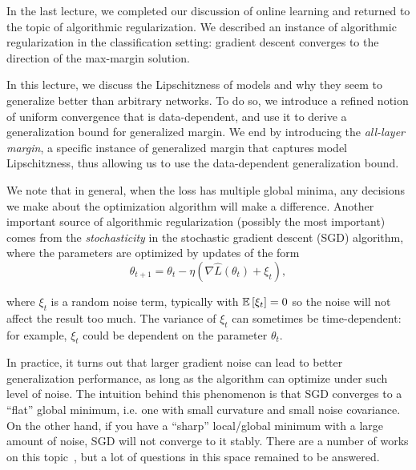 \setcounter{section}{0}




In the last lecture, we completed our discussion of online learning and returned to the topic of algorithmic regularization. We described an instance of algorithmic regularization in the classification setting: gradient descent converges to the direction of the max-margin solution.

In this lecture, we discuss the Lipschitzness of models and why they seem to generalize better than arbitrary networks. To do so, we introduce a refined notion of uniform convergence that is data-dependent, and use it to derive a generalization bound for generalized margin. We end by introducing the \textit{all-layer margin}, a specific instance of generalized margin that captures model Lipschitzness, thus allowing us to use the data-dependent generalization bound.

We note that in general, when the loss has multiple global minima, any decisions we make about the optimization algorithm will make a difference. Another important source of algorithmic regularization (possibly the most important) comes from the \textit{stochasticity} in the stochastic gradient descent (SGD) algorithm, where the parameters are optimized by updates of the form
\begin{equation}
\theta_{t+1} = \theta_t - \eta(\nabla\hat{L}(\theta_t) + \xi_t),
\end{equation}

where $\xi_t$ is a random noise term, typically with $\mathbb{E}\left[\xi_t\right]=0$ so the noise will not affect the result too much. The variance of $\xi_t$ can sometimes be time-dependent: for example, $\xi_t$ could be dependent on the parameter $\theta_t$. 

In practice, it turns out that larger gradient noise can lead to better generalization performance, as long as the algorithm can optimize under such level of noise. The intuition behind this phenomenon is that SGD converges to a ``flat'' global minimum, i.e. one with small curvature and small noise covariance. On the other hand, if you have a ``sharp'' local/global minimum with a large amount of noise, SGD will not converge to it stably. There are a number of works on this topic~\cite{haochen2020shape,blanc2020implicit}, but a lot of questions in this space remained to be answered.

